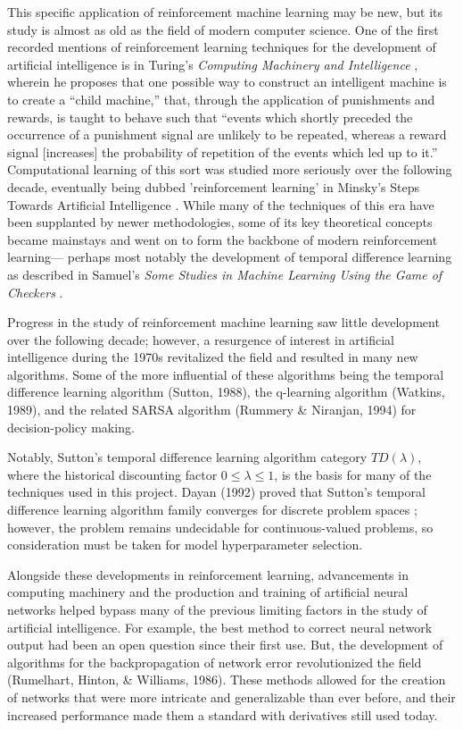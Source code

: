 This specific application of reinforcement machine learning may be new, 
but its study is almost as old as the field of modern computer science. 
One of the first recorded mentions of reinforcement learning techniques for the
development of artificial intelligence is in Turing's 
\emph{Computing Machinery and Intelligence} \cite{machinery1950computing}, 
wherein he proposes that one possible way to 
construct an intelligent machine is to create a ``child machine,'' that,
through the application of punishments and rewards, 
is taught to behave such that 
``events which shortly preceded the occurrence of a punishment signal are 
unlikely to be repeated, whereas a reward signal [increases] the probability 
of repetition of the events which led up to it.''
Computational learning of this sort was studied more seriously over the 
following decade, eventually being dubbed 'reinforcement learning' in Minsky's 
Steps Towards Artificial Intelligence \cite{minsky61}. 
While many of the techniques of this era have been supplanted by newer 
methodologies, some of its key theoretical concepts became mainstays and went 
on to form the backbone of modern reinforcement learning--- perhaps most 
notably the development of temporal difference learning as described in 
Samuel's \emph{Some Studies in Machine Learning Using the Game of Checkers}
\cite{samuel1959some}.

Progress in the study of reinforcement machine learning saw little development over the following decade; however, a resurgence of interest in artificial intelligence during the 1970s revitalized the field and resulted in many new algorithms. Some of the more influential of these algorithms being the temporal difference learning algorithm (Sutton, 1988), the q-learning algorithm (Watkins, 1989), and the related SARSA algorithm (Rummery \& Niranjan, 1994) for decision-policy making. 

Notably, Sutton's temporal difference learning algorithm category 
$TD(\lambda)$, 
where the historical discounting factor $0\le\lambda\le 1$, 
is the basis for many of the techniques used in this project. 
Dayan (1992) proved that Sutton's temporal difference learning algorithm 
family converges for discrete problem spaces \cite{dayan92}; 
however, the problem remains undecidable for continuous-valued problems, 
so consideration must be taken for model hyperparameter selection.

Alongside these developments in reinforcement learning, advancements in computing machinery and the production and training of artificial neural networks helped bypass many of the previous limiting factors in the study of artificial intelligence. For example, the best method to correct neural network output had been an open question since their first use. But, the development of algorithms for the backpropagation of network error revolutionized the field (Rumelhart, Hinton, \& Williams, 1986). These methods allowed for the creation of networks that were more intricate and generalizable than ever before, and their increased performance made them a standard with derivatives still used today.

